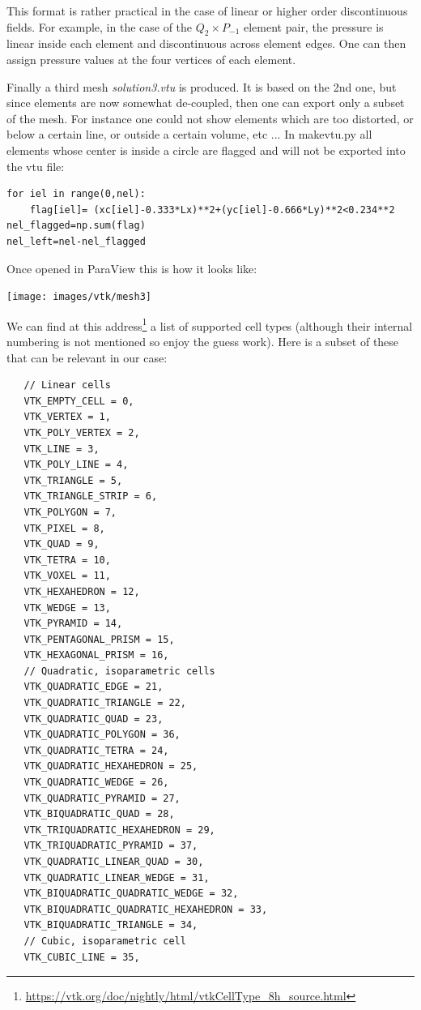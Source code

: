 This format is rather practical in the case of linear or higher order 
discontinuous fields. For example, in the case of the $Q_2\times P_{-1}$ 
element pair, the pressure is linear inside each element and discontinuous 
across element edges. One can then assign pressure values at the four 
vertices of each element. 

Finally a third mesh {\sl solution3.vtu} is produced. It is based on the 
2nd one, but since elements are now somewhat de-coupled, then one can export 
only a subset of the mesh. For instance one could not show elements which 
are too distorted, or below a certain line, or outside a certain volume, etc ... 
In {\pythonfile makevtu.py} all elements whose center is inside a circle 
are flagged and will not be exported into the vtu file:
\begin{lstlisting}
for iel in range(0,nel):
    flag[iel]= (xc[iel]-0.333*Lx)**2+(yc[iel]-0.666*Ly)**2<0.234**2
nel_flagged=np.sum(flag)
nel_left=nel-nel_flagged
\end{lstlisting}

Once opened in ParaView this is how it looks like:
\begin{center}
\texttt{[image: images/vtk/mesh3]}
\end{center}


We can find at this address\footnote{\url{https://vtk.org/doc/nightly/html/vtkCellType_8h_source.html}} 
a list of supported cell types (although their internal numbering is not mentioned so 
enjoy the guess work).
Here is a subset of these that can be relevant in our case:
\begin{verbatim}
   // Linear cells
   VTK_EMPTY_CELL = 0,
   VTK_VERTEX = 1,
   VTK_POLY_VERTEX = 2,
   VTK_LINE = 3,
   VTK_POLY_LINE = 4,
   VTK_TRIANGLE = 5,
   VTK_TRIANGLE_STRIP = 6,
   VTK_POLYGON = 7,
   VTK_PIXEL = 8,
   VTK_QUAD = 9,
   VTK_TETRA = 10,
   VTK_VOXEL = 11,
   VTK_HEXAHEDRON = 12,
   VTK_WEDGE = 13,
   VTK_PYRAMID = 14,
   VTK_PENTAGONAL_PRISM = 15,
   VTK_HEXAGONAL_PRISM = 16,
   // Quadratic, isoparametric cells
   VTK_QUADRATIC_EDGE = 21,
   VTK_QUADRATIC_TRIANGLE = 22,
   VTK_QUADRATIC_QUAD = 23,
   VTK_QUADRATIC_POLYGON = 36,
   VTK_QUADRATIC_TETRA = 24,
   VTK_QUADRATIC_HEXAHEDRON = 25,
   VTK_QUADRATIC_WEDGE = 26,
   VTK_QUADRATIC_PYRAMID = 27,
   VTK_BIQUADRATIC_QUAD = 28,
   VTK_TRIQUADRATIC_HEXAHEDRON = 29,
   VTK_TRIQUADRATIC_PYRAMID = 37,
   VTK_QUADRATIC_LINEAR_QUAD = 30,
   VTK_QUADRATIC_LINEAR_WEDGE = 31,
   VTK_BIQUADRATIC_QUADRATIC_WEDGE = 32,
   VTK_BIQUADRATIC_QUADRATIC_HEXAHEDRON = 33,
   VTK_BIQUADRATIC_TRIANGLE = 34,
   // Cubic, isoparametric cell
   VTK_CUBIC_LINE = 35,
\end{verbatim}

